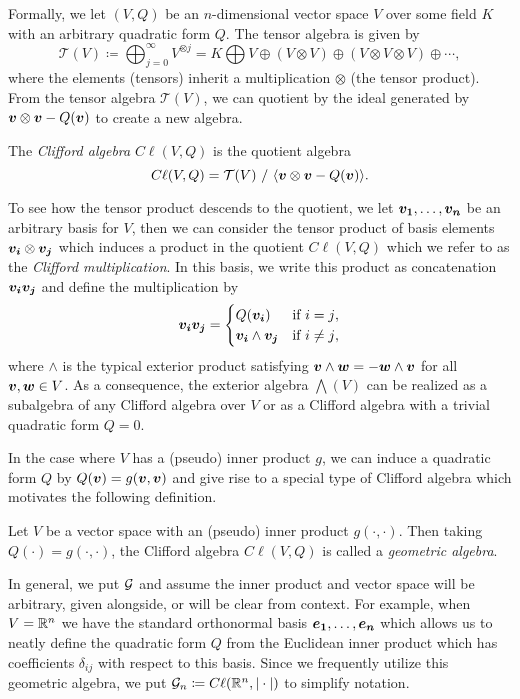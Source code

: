 Formally, we let $(V,Q)$ be an $n$-dimensional vector space $V$ over some field $K$ with an arbitrary quadratic form $Q$.  The tensor algebra is given by
\begin{equation}
\mathcal{T}(V) \coloneqq \bigoplus_{j=0}^\infty V^{\otimes j} = K \bigoplus V \oplus (V\otimes V) \oplus (V\otimes V \otimes V) \oplus \cdots,
\end{equation}
where the elements (tensors) inherit a multiplication $\otimes$ (the tensor product). From the tensor algebra $\mathcal{T}(V)$, we can quotient by the ideal generated by $\boldsymbol{v}\otimes \boldsymbol{v} - Q(\boldsymbol{v})$ to create a new algebra.
\begin{definition}
The \emph{Clifford algebra} $C\ell(V,Q)$ is the quotient algebra
\begin{equation}
C\ell(V,Q) = \mathcal{T}(V) ~ / ~ \langle \boldsymbol{v} \otimes \boldsymbol{v} - Q(\boldsymbol{v}) \rangle.
\end{equation}
\end{definition}
To see how the tensor product descends to the quotient, we let $\boldsymbol{v_1}, \dots, \boldsymbol{v_n}$ be an arbitrary basis for $V$, then we can consider the tensor product of basis elements $\boldsymbol{v_i} \otimes \boldsymbol{v_j}$ which induces a product in the quotient $C\ell(V,Q)$ which we refer to as the \emph{Clifford multiplication}. In this basis, we write this product as concatenation $\boldsymbol{v_i}\boldsymbol{v_j}$ and define the multiplication by
\begin{equation}
\label{eq:clifford_multiplication}
\boldsymbol{v_i} \boldsymbol{v_j} = \begin{cases} Q(\boldsymbol{v_i}) & \textrm{if $i=j$}, \\ \boldsymbol{v_i} \wedge \boldsymbol{v_j} & \textrm{if $i\neq j$},\end{cases}
\end{equation}
where $\wedge$ is the typical exterior product satisfying $\boldsymbol{v}\wedge \boldsymbol{w} = - \boldsymbol{w}\wedge \boldsymbol{v}$ for all $\boldsymbol{v},\boldsymbol{w}\in V$.  As a consequence, the exterior algebra $\bigwedge(V)$ can be realized as a subalgebra of any Clifford algebra over $V$ or as a Clifford algebra with a trivial quadratic form $Q=0$.  

In the case where $V$ has a (pseudo) inner product $g$, we can induce a quadratic form $Q$ by $Q(\boldsymbol{v})=g(\boldsymbol{v},\boldsymbol{v})$ and give rise to a special type of Clifford algebra which motivates the following definition.
\begin{definition}
Let $V$ be a vector space with an (pseudo) inner product $g(\cdot,\cdot)$. Then taking $Q(\cdot) = g(\cdot,\cdot)$, the Clifford algebra $C \ell(V,Q)$ is called a \emph{geometric algebra}.
\end{definition}
In general, we put $\mathcal{G}$ and assume the inner product and vector space will be arbitrary, given alongside, or will be clear from context.  For example, when $V=\mathbb{R}^n$ we have the standard orthonormal basis $\boldsymbol{e_1},\dots,\boldsymbol{e_n}$ which allows us to neatly define the quadratic form $Q$ from the Euclidean inner product which has coefficients $\delta_{ij}$ with respect to this basis. Since we frequently utilize this geometric algebra, we put $\mathcal{G}_n \coloneqq C\ell(\mathbb{R}^n, |\cdot|)$ to simplify notation. 

